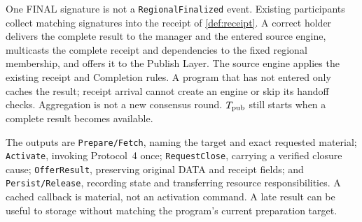 \documentclass[11pt,a4paper]{article}
\begin{document}
One FINAL signature is not a \texttt{RegionalFinalized} event. Existing
participants collect matching signatures into the receipt of
\cref{def:receipt}. A correct holder delivers the complete result to
the manager and the entered source engine, multicasts the complete
receipt and dependencies to the fixed regional membership, and offers
it to the Publish Layer. The source engine applies the existing receipt and Completion
rules. A program that has not entered only caches the result; receipt
arrival cannot create an engine or skip its handoff checks. Aggregation
is not a new consensus round. $T_{\rm pub}$ still starts when a complete
result becomes available.

The outputs are \texttt{Prepare/Fetch}, naming the target and exact
requested material; \texttt{Activate}, invoking Protocol~4 once;
\texttt{RequestClose}, carrying a verified closure cause;
\texttt{OfferResult}, preserving original DATA and receipt fields;
and \texttt{Persist/Release}, recording state and transferring resource
responsibilities. A cached callback is material, not an activation
command. A late result can be useful to storage without matching the
program's current preparation target.
\end{document}
